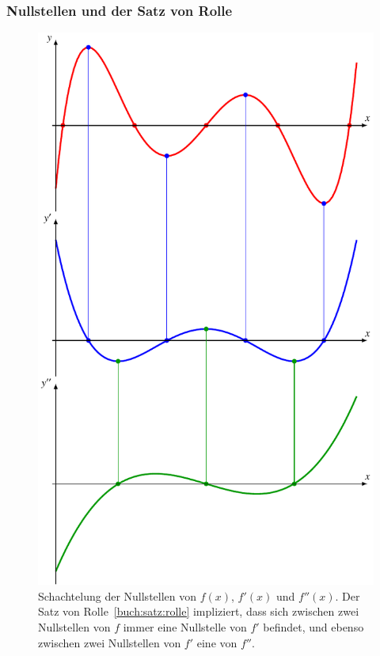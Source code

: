 \subsubsection{Nullstellen und der Satz von Rolle}
\begin{figure}
\centering
\includegraphics{chapters/30-interpolation/figures/nullstellen.pdf}
\caption{Schachtelung der Nullstellen von $f(x)$, $f'(x)$ und $f''(x)$.
Der Satz von Rolle~\ref{buch:satz:rolle} impliziert, dass sich zwischen zwei
Nullstellen von $f$ immer eine Nullstelle von $f'$ befindet, und
ebenso zwischen zwei Nullstellen von $f'$ eine von $f''$.
\label{buch:figure:nullstellen}}
\end{figure}

